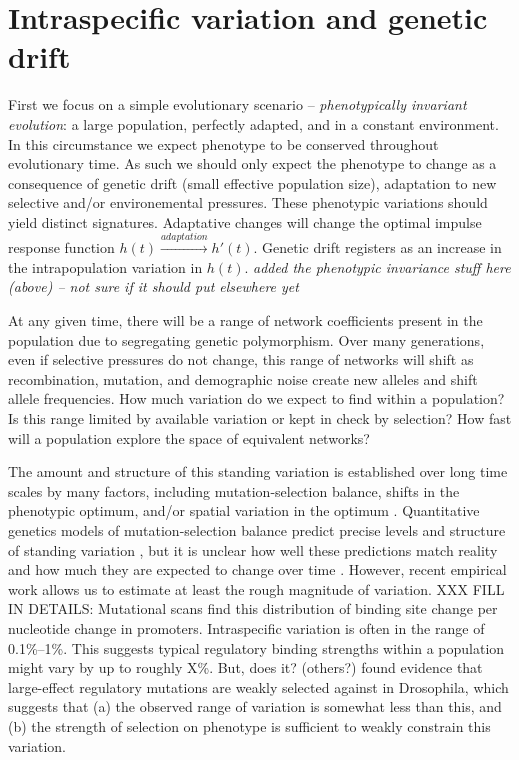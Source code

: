 \documentclass[9 pt]{article}
\newcommand{\jss}[1]{{\color{olive}\it #1}}
\newcommand{\1}{\mathbbm{1}}
\begin{document}
  \section*{Intraspecific variation and genetic drift}

First we focus on a simple evolutionary scenario -- \emph{phenotypically invariant evolution}: a large population, perfectly adapted, and in a constant environment. In this circumstance we expect phenotype to be conserved throughout evolutionary time. As such we should only expect the phenotype to change as a consequence of genetic drift (small effective population size), adaptation to new selective and/or environemental pressures. These phenotypic variations should yield distinct signatures. Adaptative changes will change the optimal impulse response function $h(t) \xrightarrow{adaptation} h'(t)$. Genetic drift registers as an increase in the intrapopulation variation in $h(t)$. 
 \jss{added the phenotypic invariance stuff here (above) -- not sure if it should put elsewhere yet}

  At any given time, there will be a range of network coefficients present in the population
  due to segregating genetic polymorphism.
  Over many generations, even if selective pressures do not change,
  this range of networks will shift 
  as recombination, mutation, and demographic noise create new alleles and shift allele frequencies.
  How much variation do we expect to find within a population?
  Is this range limited by available variation or kept in check by selection?
  How fast will a population explore the space of equivalent networks?

  The amount and structure of 
  this standing variation is established over long time scales
  by many factors, including
  mutation-selection balance, 
  shifts in the phenotypic optimum,
  and/or spatial variation in the optimum \citep{sources_of_standing_var}.
  Quantitative genetics models of mutation-selection balance 
  predict precise levels and structure of standing variation \citep{kimura_mutsel,lande_mutsel},
  but it is unclear how well these predictions match reality \citep{johnson_barton}
  and how much they are expected to change over time \citep{arnold_changing_G}.
  However, recent empirical work allows us to estimate at least the rough magnitude of variation.
  XXX FILL IN DETAILS: 
  Mutational scans find this distribution of binding site change per nucleotide change in promoters.
  Intraspecific variation is often in the range of 0.1\%--1\%.
  This suggests typical regulatory binding strengths within a population might vary by up to roughly X\%.
  But, does it?
  \citet{maria_and_sergey} (others?) found evidence that large-effect regulatory mutations are weakly selected against in Drosophila,
  which suggests that (a) the observed range of variation is somewhat less than this,
  and (b) the strength of selection on phenotype is sufficient to weakly constrain this variation.
\end{document}
